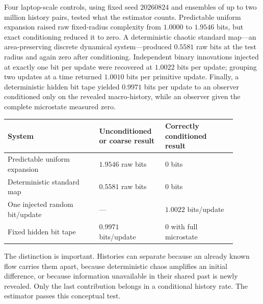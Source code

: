 \documentclass[10pt]{article}
\begin{document}
Four laptop-scale controls, using fixed seed $20260824$ and ensembles of up to
two million history pairs, tested what the estimator counts.  Predictable
uniform expansion raised raw fixed-radius complexity from $1.0000$ to
$1.9546$ bits, but exact conditioning reduced it to zero.  A deterministic
chaotic standard map---an area-preserving discrete dynamical system---produced
$0.5581$ raw bits at the test radius and again zero after conditioning.
Independent binary innovations injected at exactly
one bit per update were recovered at $1.0022$ bits per update; grouping two
updates at a time returned $1.0010$ bits per primitive update.  Finally, a
deterministic hidden bit tape yielded $0.9971$ bits per update to an observer
conditioned only on the revealed macro-history, while an observer given the
complete microstate measured zero.

\begin{center}
\label{tab:controls}
\small
\begin{tabular}{>{\raggedright\arraybackslash}p{0.36\linewidth}
                >{\raggedright\arraybackslash}p{0.25\linewidth}
                >{\raggedright\arraybackslash}p{0.28\linewidth}}
\toprule
System & Unconditioned or coarse result & Correctly conditioned result\\
\midrule
Predictable uniform expansion & $1.9546$ raw bits & $0$ bits\\
Deterministic standard map & $0.5581$ raw bits & $0$ bits\\
One injected random bit/update & --- & $1.0022$ bits/update\\
Fixed hidden bit tape & $0.9971$ bits/update & $0$ with full microstate\\
\bottomrule
\end{tabular}
\end{center}

The distinction is important.  Histories can separate because an already
known flow carries them apart, because deterministic chaos amplifies an
initial difference, or because information unavailable in their shared past
is newly revealed.  Only the last contribution belongs in a conditional
history rate.  The estimator passes this conceptual test.
\end{document}

